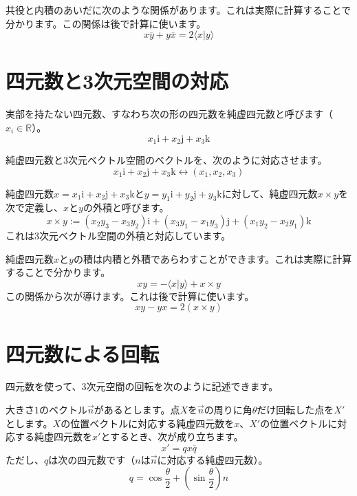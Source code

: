 \documentclass{jlreq}
\numberwithin{equation}{section}
\newcommand{\ii}{\mathrm{i}}
\newcommand{\jj}{\mathrm{j}}
\newcommand{\kk}{\mathrm{k}}
\begin{document}
共役と内積のあいだに次のような関係があります。これは実際に計算することで分かります。この関係は後で計算に使います。
\begin{equation}
    x\overline{y}+y\overline{x}=2\langle x|y\rangle
\end{equation}

\section{四元数と3次元空間の対応}

\begin{definition}[純虚四元数]
    実部を持たない四元数、すなわち次の形の四元数を純虚四元数と呼びます（$x_i\in\mathbb{R}$）。
    \begin{equation}
        x_1\ii+x_2\jj+x_3\kk
    \end{equation}
\end{definition}

純虚四元数と3次元ベクトル空間のベクトルを、次のように対応させます。
\begin{equation}
    x_1\ii+x_2\jj+x_3\kk\leftrightarrow(x_1,x_2,x_3)
\end{equation}

純虚四元数$x=x_1\ii+x_2\jj+x_3\kk$と$y=y_1\ii+y_2\jj+y_3\kk$に対して、純虚四元数$x\times y$を次で定義し、$x$と$y$の外積と呼びます。
\begin{equation}
    x\times y:=(x_2y_3-x_3y_2)\ii+(x_3y_1-x_1y_3)\jj+(x_1y_2-x_2y_1)\kk
\end{equation}
これは3次元ベクトル空間の外積と対応しています。

純虚四元数$x$と$y$の積は内積と外積であらわすことができます。これは実際に計算することで分かります。
\begin{equation}
    xy=-\langle x|y\rangle+x\times y
\end{equation}
この関係から次が導けます。これは後で計算に使います。
\begin{equation}
    xy-yx=2(x\times y)
\end{equation}

\section{四元数による回転}

四元数を使って、3次元空間の回転を次のように記述できます。

\begin{theorem}[四元数による回転]
    大きさ$1$のベクトル$\vec{n}$があるとします。点$X$を$\vec{n}$の周りに角$\theta$だけ回転した点を$X'$とします。$X$の位置ベクトルに対応する純虚四元数を$x$、$X'$の位置ベクトルに対応する純虚四元数を$x'$とするとき、次が成り立ちます。
    \begin{equation}
        x'=qx\overline{q}
    \end{equation}
    ただし、$q$は次の四元数です（$n$は$\vec{n}$に対応する純虚四元数）。
    \begin{equation}
        q=\cos\frac{\theta}{2}+\left(\sin\frac{\theta}{2}\right)n
    \end{equation}
\end{theorem}
\end{document}
